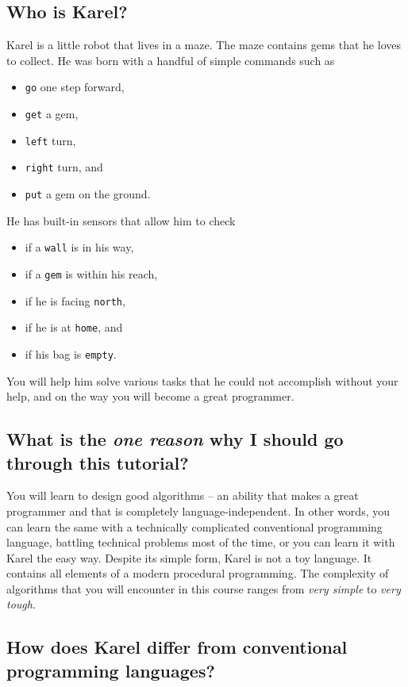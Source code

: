 \documentclass[article,A4,12pt]{llncs}
\begin{document}
\subsection{Who is Karel?}

Karel is a little robot that lives in a maze. The maze contains gems that he loves to collect. 
He was born with a handful of simple commands such as 
\begin{itemize}
\item {\tt go} one step forward, 
\item {\tt get} a gem, 
\item {\tt left} turn, 
\item {\tt right} turn, and 
\item {\tt put} a gem on the ground. 
\end{itemize}
He has built-in sensors that 
allow him to check 
\begin{itemize}
\item if a {\tt wall} is in his way, 
\item if a {\tt gem} is within his reach, 
\item if he is facing {\tt north}, 
\item if he is at {\tt home}, and 
\item if his bag is {\tt empty}. 
\end{itemize}
You will help him solve various 
tasks that he could not accomplish without your help, and on the 
way you will become a great programmer.

\subsection{What is the {\em one reason} why I should go through this tutorial?}

You will learn to design good algorithms -- an ability that makes
a great programmer and that is completely language-independent. In other 
words, you can learn the same with a technically complicated conventional 
programming language, battling technical problems most of the time,
or you can learn it with Karel the easy way.
Despite its simple form, Karel is not a toy language. It contains all elements 
of a modern procedural programming. The complexity of algorithms 
that you will encounter in this course ranges from {\em very simple} 
to {\em very tough}.

\subsection{How does Karel differ from conventional programming languages?}
\end{document}
